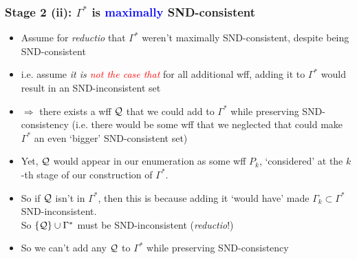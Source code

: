 \begin{frame}
\frametitle{Stage 2 (ii): $\Gamma^{\ast}$ is \textcolor{blue}{maximally} SND-consistent}

\begin{itemize}[<+->]

\item Assume for \textit{reductio} that $\Gamma^{\ast}$ weren't maximally SND-consistent, despite being SND-consistent

\item i.e. assume \textit{it is \textcolor{red}{not the case that}} for all additional wff, adding it to $\Gamma^{\ast}$ would result in an \textcolor{OGlyallpink}{SND-inconsistent} set


\item[] $\Rightarrow$ there exists a wff $\mathcal{Q}$ that we could add to $\Gamma^{\ast}$ while preserving \alert{SND-consistency} (i.e. there would be some wff that we neglected that could make  $\Gamma^{\ast}$ an even `bigger' SND-consistent set)

\item Yet, $\mathcal{Q}$ would appear in our enumeration as some wff $P_k$, `considered' at the $k$-th stage of our construction of $\Gamma^{\ast}$.

\item So if $\mathcal{Q}$ isn't in $\Gamma^{\ast}$, then this is because adding it `would have' made $\Gamma_k \subset \Gamma^{\ast}$ \textcolor{OGlyallpink}{SND-inconsistent}. \\ So $\{\mathcal{Q}\} \cup \Gamma^{\ast}$ must be SND-inconsistent (\textit{reductio}!)






\item So we can't add any $\mathcal{Q}$ to $\Gamma^{\ast}$ while preserving SND-consistency 


\end{itemize}
\end{frame}

